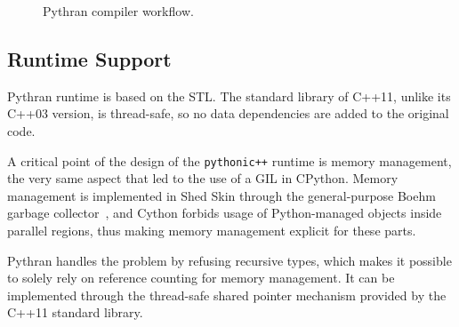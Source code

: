 \documentclass{sigplanconf}
\begin{document}
\begin{figure}

\centering
{}
\caption{Pythran compiler workflow.}
\label{fig:pythran-compiler}
\end{figure}

\subsection{Runtime Support}

Pythran runtime is based on the STL. The standard library of C++11, unlike its
C++03 version, is thread-safe, so no data dependencies are added to the original
code.

A critical point of the design of the \texttt{pythonic++} runtime is memory
management, the very same aspect that led to the use of a GIL in CPython.
Memory management is implemented in Shed Skin through the general-purpose Boehm
garbage collector~\cite{boehm1991}, and Cython forbids usage of Python-managed
objects inside parallel regions, thus making memory management explicit for
these parts.

Pythran handles the problem by refusing recursive types, which makes it possible
to solely rely on reference counting for memory management. It can be
implemented through the thread-safe shared pointer mechanism provided by the C++11
standard library.
\end{document}
